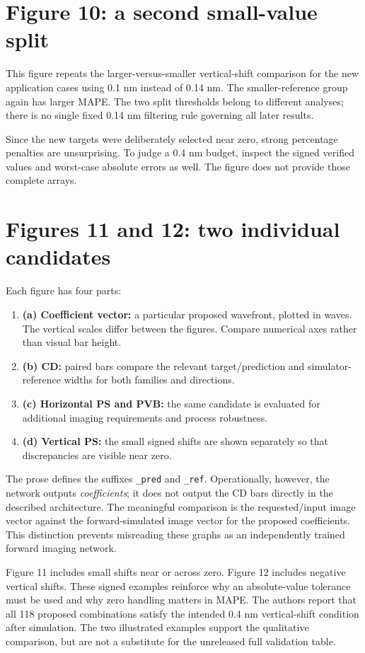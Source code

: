 \section{Figure 10: a second small-value split}
This figure repeats the larger-versus-smaller vertical-shift comparison
for the new application cases using 0.1 nm instead of 0.14 nm.
The smaller-reference group again has larger MAPE.
The two split thresholds belong to different analyses; there is no
single fixed 0.14 nm filtering rule governing all later results.

Since the new targets were deliberately selected near zero, strong
percentage penalties are unsurprising. To judge a 0.4 nm budget, inspect
the signed verified values and worst-case absolute errors as well.
The figure does not provide those complete arrays.

\section{Figures 11 and 12: two individual candidates}
Each figure has four parts:
\begin{enumerate}
\item \textbf{(a) Coefficient vector:} a particular proposed wavefront,
plotted in waves. The vertical scales differ between the figures.
Compare numerical axes rather than visual bar height.
\item \textbf{(b) CD:} paired bars compare the relevant target/prediction
and simulator-reference widths for both families and directions.
\item \textbf{(c) Horizontal PS and PVB:} the same candidate is evaluated
for additional imaging requirements and process robustness.
\item \textbf{(d) Vertical PS:} the small signed shifts are shown
separately so that discrepancies are visible near zero.
\end{enumerate}
The prose defines the suffixes \texttt{\_pred} and \texttt{\_ref}.
Operationally, however, the network outputs \emph{coefficients};
it does not output the CD bars directly in the described architecture.
The meaningful comparison is the requested/input image vector against
the forward-simulated image vector for the proposed coefficients.
This distinction prevents misreading these graphs as an independently
trained forward imaging network.

Figure 11 includes small shifts near or across zero.
Figure 12 includes negative vertical shifts.
These signed examples reinforce why an absolute-value tolerance must
be used and why zero handling matters in MAPE.
The authors report that all 118 proposed combinations satisfy the
intended 0.4 nm vertical-shift condition after simulation.
The two illustrated examples support the qualitative comparison, but
are not a substitute for the unreleased full validation table.

